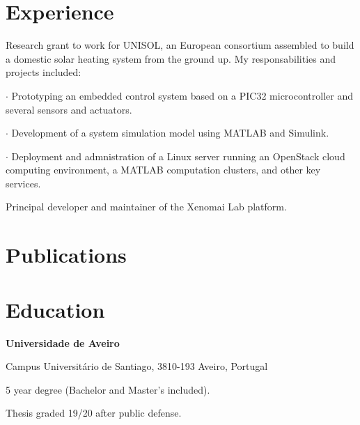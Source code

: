 \section*{Experience}

{
Research grant to work for UNISOL, an European consortium assembled
to build a domestic solar heating system from the ground up. My
responsabilities and projects included:

 $\cdot$  Prototyping an embedded control system based on a PIC32 microcontroller and
several sensors and actuators.

 $\cdot$  Development of a system simulation model using MATLAB and Simulink.

 $\cdot$  Deployment and admnistration of a Linux server running an OpenStack cloud
computing environment, a MATLAB computation clusters, and other key services.
}

{
Principal developer and maintainer of the Xenomai Lab platform.
}

\section*{Publications}


\section*{Education}

{
\textbf{Universidade de Aveiro}

Campus Universitário de Santiago, 3810-193 Aveiro, Portugal
}
{
5 year degree (Bachelor and Master's included).

Thesis graded 19/20 after public defense. 
}

